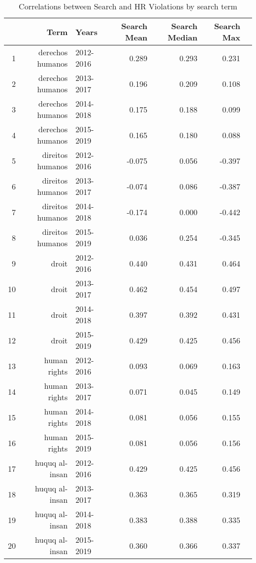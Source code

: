 \begin{table}[ht]
\centering
\begin{tabular}{|r|rlrrrr||}
  \hline
 & Term & Years & Search Mean & Search Median & Search Max \\ 
  \hline
1 & derechos humanos & 2012-2016 & 0.289 & 0.293 & 0.231 \\ 
  2 & derechos humanos & 2013-2017 & 0.196 & 0.209 & 0.108 \\ 
  3 & derechos humanos & 2014-2018 & 0.175 & 0.188 & 0.099 \\ 
  4 & derechos humanos & 2015-2019 & 0.165 & 0.180 & 0.088 \\ 
  5 & direitos humanos & 2012-2016 & -0.075 & 0.056 & -0.397 \\ 
  6 & direitos humanos & 2013-2017 & -0.074 & 0.086 & -0.387 \\ 
  7 & direitos humanos & 2014-2018 & -0.174 & 0.000 & -0.442 \\ 
  8 & direitos humanos & 2015-2019 & 0.036 & 0.254 & -0.345 \\ 
  9 & droit & 2012-2016 & 0.440 & 0.431 & 0.464 \\ 
  10 & droit & 2013-2017 & 0.462 & 0.454 & 0.497 \\ 
  11 & droit & 2014-2018 & 0.397 & 0.392 & 0.431 \\ 
  12 & droit & 2015-2019 & 0.429 & 0.425 & 0.456 \\ 
  13 & human rights & 2012-2016 & 0.093 & 0.069 & 0.163 \\ 
  14 & human rights & 2013-2017 & 0.071 & 0.045 & 0.149 \\ 
  15 & human rights & 2014-2018 & 0.081 & 0.056 & 0.155 \\ 
  16 & human rights & 2015-2019 & 0.081 & 0.056 & 0.156 \\ 
  17 & huquq al-insan & 2012-2016 & 0.429 & 0.425 & 0.456 \\ 
  18 & huquq al-insan & 2013-2017 & 0.363 & 0.365 & 0.319 \\ 
  19 & huquq al-insan & 2014-2018 & 0.383 & 0.388 & 0.335 \\ 
  20 & huquq al-insan & 2015-2019 & 0.360 & 0.366 & 0.337 \\ 
   \hline
\end{tabular}
\caption{Correlations between Search and HR Violations by search term} 
\end{table}
